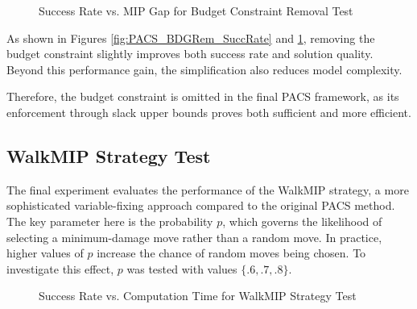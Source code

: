 \begin{figure}[H]
\centering
\begin{minipage}{0.6\columnwidth}
\centering
\resizebox{\linewidth}{!}{}
\end{minipage}%
\hfill
\begin{minipage}{0.4\columnwidth}
\centering
\resizebox{\linewidth}{!}{}
\end{minipage}
\caption{Success Rate vs. MIP Gap for Budget Constraint Removal Test}
\label{fig:PACS_BDGRem_MGAP}
\end{figure}

As shown in Figures \ref{fig:PACS_BDGRem_SuccRate} and \ref{fig:PACS_BDGRem_MGAP}, removing the budget constraint slightly improves both success rate and solution quality. Beyond this performance gain, the simplification also reduces model complexity.

Therefore, the budget constraint is omitted in the final PACS framework, as its enforcement through slack upper bounds proves both sufficient and more efficient.

\subsection{WalkMIP Strategy Test}\label{sec:test_walkMIP}
The final experiment evaluates the performance of the WalkMIP strategy, a more sophisticated variable-fixing approach compared to the original PACS method. The key parameter here is the probability $p$, which governs the likelihood of selecting a minimum-damage move rather than a random move. In practice, higher values of $p$ increase the chance of random moves being chosen. To investigate this effect, $p$ was tested with values $\{.6, .7, .8\}$.
\begin{figure}[H]
\centering
\begin{minipage}{0.6\columnwidth}
\centering
\resizebox{\linewidth}{!}{}
\end{minipage}%
\hfill
\begin{minipage}{0.4\columnwidth}
\centering
\resizebox{\linewidth}{!}{}
\end{minipage}
\caption{Success Rate vs. Computation Time for WalkMIP Strategy Test}
\label{fig:PACS_WalkMIP_SuccRate}
\end{figure}

